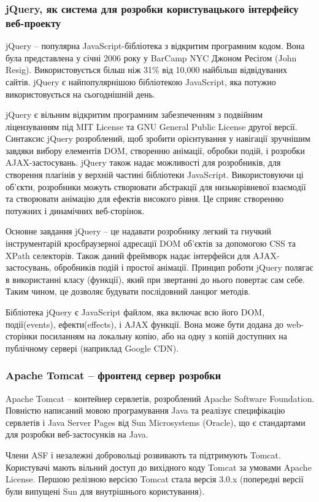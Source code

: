 \subsubsection{jQuery, як система для розробки користувацького інтерфейсу веб-проекту}
\par jQuery -- популярна JavaScript-бібліотека з відкритим програмним кодом. Вона була представлена у січні 2006 року у BarCamp NYC Джоном Ресіґом (John Resig). Використовується більш ніж 31\% від 10,000 найбільш відвідуваних сайтів. jQuery є найпопулярнішою бібліотекою JavaScript, яка потужно використовується на сьогоднішній день\cite{jquery_usage}.
\par jQuery є вільним відкритим програмним забезпеченням з подвійним ліцензуванням під MIT License та GNU General Public License другої версії. Синтаксис jQuery розроблений, щоб зробити орієнтування у навігації зручнішим завдяки вибору елементів DOM, створенню анімації, обробки подій, і розробки AJAX-застосувань. jQuery також надає можливості для розробників, для створення плагінів у верхній частині бібліотеки JavaScript. Використовуючи ці об'єкти, розробники можуть створювати абстракції для низькорівневої взаємодії та створювати анімацію для ефектів високого рівня. Це сприяє створенню потужних і динамічних веб-сторінок.
\par Основне завдання jQuery -- це надавати розробнику легкий та гнучкий інструментарій кросбраузерної адресації DOM об'єктів за допомогою CSS та XPath селекторів. Також даний фреймворк надає інтерфейси для AJAX-застосувань, обробників подій і простої анімації.
Принцип роботи jQuery полягає в використанні класу (функції), який при звертанні до нього повертає сам себе. Таким чином, це дозволяє будувати послідовний ланцюг методів.
\par Бібліотека jQuery є JavaScript файлом, яка включає всю його DOM, події(events), ефекти(effects), і AJAX функції. Вона може бути додана до web-сторінки посиланням на локальну копію, або на одну з копій доступних на публічному сервері (наприклад Google CDN).


\subsubsection{Apache Tomcat -- фронтенд сервер розробки}
\par Apache Tomcat -- контейнер сервлетів, розроблений Apache Software Foundation. Повністю написаний мовою програмування Java та реалізує специфікацію сервлетів і Java Server Pages від Sun Microsystems (Oracle), що є стандартами для розробки веб-застосунків на Java.
\par Члени ASF і незалежні добровольці розвивають та підтримують Tomcat. Користувачі мають вільний доступ до вихідного коду Tomcat за умовами Apache License. Першою релізною версією Tomcat стала версія 3.0.x (попередні версії були випущені Sun для внутрішнього користування).



